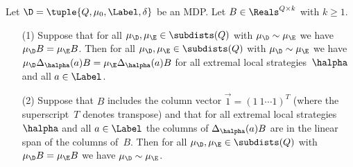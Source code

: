 \begin{prop}\label{prop-coNP-vector-space}
Let $\D = \tuple{Q,\mu_{0},\Label,\delta}$ be an MDP\@.
Let $B \in \Reals^{Q \times k}$ with $k \ge 1$.
\begin{enumerate}
\item[(1)] Suppose that for all $\mu_\D, \mu_\E \in \subdists(Q)$ with $\mu_\D \sim \mu_\E$ we have $\mu_\D B = \mu_\E B$.
    Then for all $\mu_\D, \mu_\E \in \subdists(Q)$ with $\mu_\D \sim \mu_\E$ we have $\mu_\D \Delta_{\halpha}(a) B = \mu_\E \Delta_{\halpha}(a) B$ for all extremal local strategies~$\halpha$ and all $a \in \Label$.
\item[(2)] Suppose that $B$ includes the column vector $\vec{1} = {(1 \ 1 \cdots 1)}^T$ (where the superscript~$T$ denotes transpose) and that for all extremal local strategies~$\halpha$ and all $a \in \Label$ the columns of $\Delta_{\halpha}(a) B$ are in the linear span of the columns of~$B$.
    Then for all $\mu_\D, \mu_\E \in \subdists(Q)$ with $\mu_\D B = \mu_\E B$ we have $\mu_\D \sim \mu_\E$.
\end{enumerate}
\end{prop}

